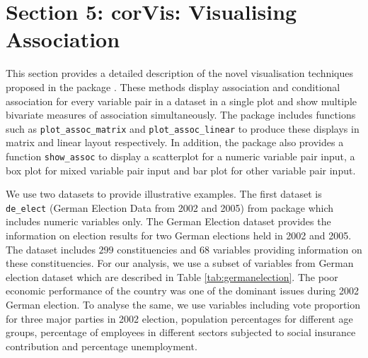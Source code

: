 \hypertarget{section-5-corvis-visualising-association}{%
\section{Section 5: corVis: Visualising
Association}\label{section-5-corvis-visualising-association}}

This section provides a detailed description of the novel visualisation
techniques proposed in the package . These methods
display association and conditional association for every variable pair
in a dataset in a single plot and show multiple bivariate measures of
association simultaneously. The package includes functions such as
\texttt{plot\_assoc\_matrix} and \texttt{plot\_assoc\_linear} to produce
these displays in matrix and linear layout respectively. In addition,
the package also provides a function \texttt{show\_assoc} to display a
scatterplot for a numeric variable pair input, a box plot for mixed
variable pair input and bar plot for other variable pair input.

We use two datasets to provide illustrative examples. The first dataset
is \texttt{de\_elect} (German Election Data from 2002 and 2005) from
 package which includes numeric variables only. The
German Election dataset provides the information on election results for
two German elections held in 2002 and 2005. The dataset includes \(299\)
constituencies and \(68\) variables providing information on these
constituencies. For our analysis, we use a subset of variables from
German election dataset which are described in Table
\ref{tab:germanelection}. The poor economic performance of the country
was one of the dominant issues during 2002 German election. To analyse
the same, we use variables including vote proportion for three major
parties in 2002 election, population percentages for different age
groups, percentage of employees in different sectors subjected to social
insurance contribution and percentage unemployment.

